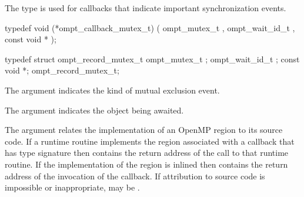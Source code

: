 \summary
The  type is used for callbacks that indicate
important synchronization events.

\format
\begin{ccppspecific}
\begin{omptCallback}
typedef void (*ompt_callback_mutex_t) (
  ompt_mutex_t ,
  ompt_wait_id_t ,
  const void *
);
\end{omptCallback}
\end{ccppspecific}

\record
\begin{ccppspecific}
\begin{omptRecord}
typedef struct ompt_record_mutex_t {
  ompt_mutex_t ;
  ompt_wait_id_t ;
  const void *;
} ompt_record_mutex_t;
\end{omptRecord}
\end{ccppspecific}

\argdesc
The  argument indicates the kind of mutual exclusion event.

The  argument indicates the object being awaited.

The  argument relates the implementation of an OpenMP region
to its source code. If a runtime routine implements the region associated with
a callback that has type signature  then
 contains the return address of the call to that runtime routine.
If the implementation of the region is inlined then  contains the
return address of the invocation of the callback. If attribution to source code
is impossible or inappropriate,  may be .

